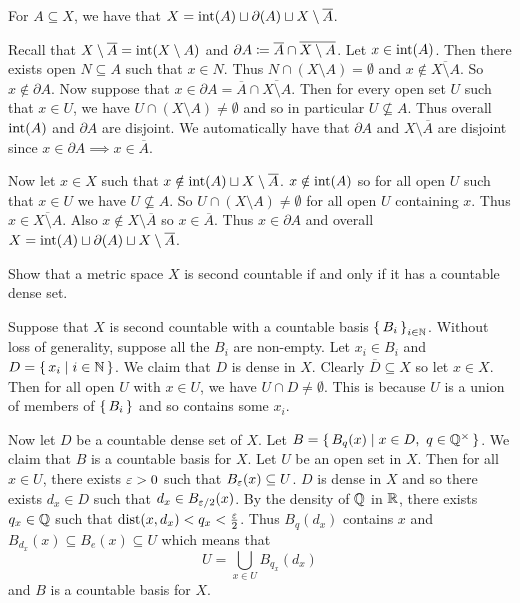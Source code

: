 \documentclass[letterpaper, 11pt, oneside]{book}
\begin{document}
\begin{exercise}
  For $A \subseteq X$, we have that $X = \operatorname{int}(A) \sqcup \partial(A) \sqcup X \setminus \overline{A}$.
\end{exercise}
\begin{pf}
  Recall that $X \setminus \overline{A} = \operatorname{int}(X \setminus A)$ and $\partial A \coloneqq \overline{A} \cap \overline{X \setminus A}$.
  Let $x \in \operatorname{int}(A)$.
  Then there exists open $N \subseteq A$ such that $x \in N$.
  Thus $N \cap (X \setminus A) = \emptyset$ and $x \notin \overline{X \setminus A}$.
  So $x \notin \partial A$.
  Now suppose that $x \in \partial A = \overline{A} \cap \overline{X \setminus A}$.
  Then for every open set $U$ such that $x \in U$, we have $U \cap (X \setminus A) \neq \emptyset$ and so in particular $U \not\subseteq A$.
  Thus overall $\operatorname{int}(A)$ and $\partial A$ are disjoint.
  We automatically have that $\partial A$ and $X \setminus \overline{A}$ are disjoint since $x \in \partial A \implies x \in \overline{A}$.

  Now let $x \in X$ such that $x \notin \operatorname{int}(A) \sqcup X \setminus \overline{A}$.
  $x \notin \operatorname{int}(A)$ so for all open $U$ such that $x \in U$ we have $U \not\subseteq A$.
  So $U \cap (X \setminus A) \neq \emptyset$ for all open $U$ containing $x$.
  Thus $x \in \overline{X \setminus A}$.
  Also $x \notin X \setminus \overline{A}$ so $x \in \overline{A}$.
  Thus $x \in \partial A$ and overall $X = \operatorname{int}(A) \sqcup \partial(A) \sqcup X \setminus \overline{A}$.
\end{pf}

\begin{exercise}\label{exercise: countable_iff_countable_dense}
  Show that a metric space $X$ is second countable if and only if it has a countable dense set.
\end{exercise}
\begin{pf}
  Suppose that $X$ is second countable with a countable basis $\set{B_{i}}_{i \in \mathbb{N}}$.
  Without loss of generality, suppose all the $B_{i}$ are non-empty.
  Let $x_{i} \in B_{i}$ and $D = \set{x_{i} \mid i \in \mathbb{N}}$.
  We claim that $D$ is dense in $X$.
  Clearly $\overline{D} \subseteq X$ so let $x \in X$.
  Then for all open $U$ with $x \in U$, we have $U \cap D \neq \emptyset$.
  This is because $U$ is a union of members of $\set{B_{i}}$ and so contains some $x_{i}$.

  Now let $D$ be a countable dense set of $X$.
  Let $B = \set{B_{q}(x) | x \in D,~ q \in \mathbb{Q}^{\times}}$.
  We claim that $B$ is a countable basis for $X$.
  Let $U$ be an open set in $X$.
  Then for all $x \in U$, there exists $\varepsilon > 0$ such that $B_{\varepsilon}(x) \subseteq U$.
  $D$ is dense in $X$ and so there exists $d_{x} \in D$ such that $d_{x} \in B_{\varepsilon /2}(x)$.
  By the density of $\mathbb{Q}$ in $\mathbb{R}$, there exists $q_{x} \in \mathbb{Q}$ such that $\operatorname{dist}(x, d_{x}) < q_{x} < \frac{\varepsilon}{2}$.
  Thus $B_{q}(d_{x})$ contains $x$ and $B_{d_{x}}(x) \subseteq B_{e}(x) \subseteq U$ which means that
  \[
    U = \bigcup_{x \in U} B_{q_{x}}(d_{x})
  \]
  and $B$ is a countable basis for $X$.
\end{pf}
\end{document}
